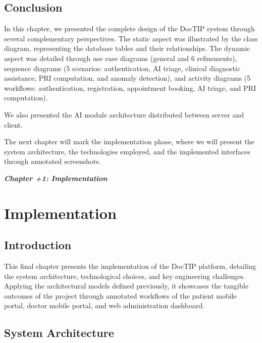 \documentclass[12pt,a4paper,oneside]{report}
\newcommand{\chapterflyleaf}[1]{%
    \clearpage
    \thispagestyle{empty}
    \vspace*{\fill}
    \begin{center}
        {\bfseries\Huge\itshape Chapter \number\numexpr\value{chapter}+1\relax: #1}
    \end{center}
    \vspace*{\fill}
    \clearpage
}
\begin{document}
\section*{Conclusion}
{}

In this chapter, we presented the complete design of the DocTIP system through several complementary perspectives. The static aspect was illustrated by the class diagram, representing the database tables and their relationships. The dynamic aspect was detailed through use case diagrams (general and 6 refinements), sequence diagrams (5 scenarios: authentication, AI triage, clinical diagnostic assistance, PRI computation, and anomaly detection), and activity diagrams (5 workflows: authentication, registration, appointment booking, AI triage, and PRI computation).

We also presented the AI module architecture distributed between server and client.

The next chapter will mark the implementation phase, where we will present the system architecture, the technologies employed, and the implemented interfaces through annotated screenshots.


\chapterflyleaf{Implementation}
\chapter{Implementation}

\section*{Introduction}
{}

This final chapter presents the implementation of the DocTIP platform, detailing the system architecture, technological choices, and key engineering challenges. Applying the architectural models defined previously, it showcases the tangible outcomes of the project through annotated workflows of the patient mobile portal, doctor mobile portal, and web administration dashboard.

\section{System Architecture}
\end{document}
